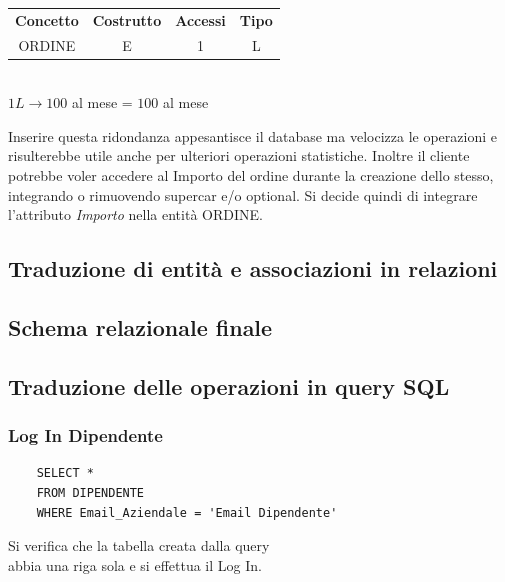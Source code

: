 \documentclass[12pt]{article}
\begin{document}
\begin{table}[H]
    \centering
    \begin{tabular}{c c c c}
        \rowcolor{red!20!}
        \textbf{Concetto} & \textbf{Costrutto} & \textbf{Accessi} &
        \textbf{Tipo}\\
        ORDINE & E & 1 & L \\
    \end{tabular}\\
    \( 1L \rightarrow 100 \) al mese = \( 100 \) al mese
\end{table}

Inserire questa ridondanza appesantisce il database ma velocizza le operazioni e
risulterebbe utile anche per ulteriori operazioni statistiche. Inoltre il
cliente potrebbe voler accedere al Importo del ordine durante la creazione dello
stesso, integrando o rimuovendo supercar e/o optional.
Si decide quindi di integrare l'attributo \textit{Importo} nella entità ORDINE.


\subsection{Traduzione di entità e associazioni in relazioni}

\subsection{Schema relazionale finale}

\subsection{Traduzione delle operazioni in query SQL}

\lstset{style=sqlStyle}

\subsubsection*{Log In Dipendente}

\begin{lstlisting}
    SELECT * 
    FROM DIPENDENTE 
    WHERE Email_Aziendale = 'Email Dipendente'
\end{lstlisting}
Si verifica che la tabella creata dalla query \\
abbia una riga sola e si effettua il Log In.
\end{document}
